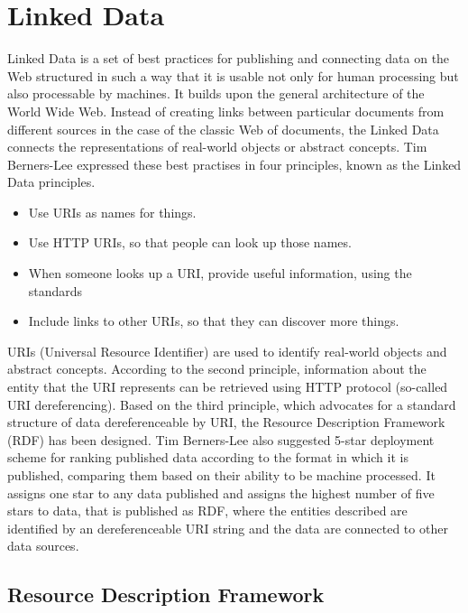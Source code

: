 \chapter{Linked Data\label{linkeddata}}

Linked Data is a set of best practices for publishing and connecting data on the Web structured in such a way that it is usable not only for human processing but also processable by machines. It builds upon the general architecture of the World Wide Web. Instead of creating links between particular documents from different sources in the case of the classic Web of documents, the Linked Data connects the representations of real-world objects or abstract concepts. Tim Berners-Lee expressed these best practises in four principles, known as the Linked Data principles.\cite{bernersLee2006}

\begin{itemize}
    \item Use URIs as names for things.
    \item Use HTTP URIs, so that people can look up those names.
    \item When someone looks up a URI, provide useful information, using the standards
    \item Include links to other URIs, so that they can discover more things.
\end{itemize}

URIs (Universal Resource Identifier) are used to identify real-world objects and abstract concepts. According to the second principle, information about the entity that the URI represents can be retrieved using HTTP protocol (so-called URI dereferencing). Based on the third principle, which advocates for a standard structure of data dereferenceable by URI, the Resource Description Framework (RDF) has been designed. Tim Berners-Lee also suggested 5-star deployment scheme for ranking published data according to the format in which it is published, comparing them based on their ability to be machine processed. It assigns one star to any data published and assigns the highest number of five stars to data, that is published as RDF, where the entities described are identified by an dereferenceable URI string and the data are connected to other data sources.

\section{Resource Description Framework}

